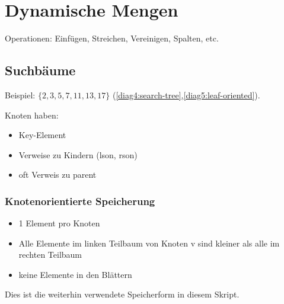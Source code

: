%
%

\chapter{Dynamische Mengen}
    Operationen: Einfügen, Streichen, Vereinigen, Spalten, etc. \\
    
    \section{Suchbäume}
        Beispiel: $\{ 2,3,5,7,11,13,17 \}$ (\autoref{diag4:search-tree},\autoref{diag5:leaf-oriented}).

        Knoten haben: 
        \begin{itemize}
            \item Key-Element
            \item Verweise zu Kindern (lson, rson)
            \item oft Verweis zu parent
        \end{itemize}
        
        
         \subsection{Knotenorientierte Speicherung} 
            \begin{itemize}
                \item 1 Element pro Knoten
                \item Alle Elemente im linken Teilbaum von Knoten v sind kleiner als alle im rechten Teilbaum
                \item keine Elemente in den Blättern
            \end{itemize}
            Dies ist die weiterhin verwendete Speicherform in diesem Skript.
            
